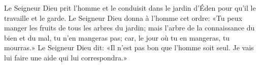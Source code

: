 Le Seigneur Dieu prit l’homme et le conduisit dans le jardin d’Éden
	pour qu’il le travaille et le garde.
Le Seigneur Dieu donna à l’homme cet ordre:
	«Tu peux manger les fruits de tous les arbres du jardin;
	mais l’arbre de la connaissance du bien et du mal, tu n’en mangeras pas;
	car, le jour où tu en mangeras, tu mourras.»
Le Seigneur Dieu dit: «Il n’est pas bon que l’homme soit seul.
	Je vais lui faire une aide qui lui correspondra.»
